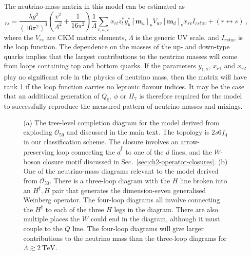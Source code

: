 The neutrino-mass matrix in this model can be estimated as
\begin{equation}
  [\mathbf{m}_{\nu}]_{rs} = \frac{\lambda g^{2}}{(16\pi^{2})^{3}} \left( \frac{v^{2}}{\Lambda^{2}} + \frac{1}{16\pi^{2}}\right) \frac{1}{\Lambda}\sum_{t,u,v} x_{rt} z^{*}_{t} y^{*}_{u} [\mathbf{m}_{u}]_{u} V_{uv} [\mathbf{m}_{d}]_{v} x_{sv} I_{rstuv} + (r \leftrightarrow s) \ ,
\end{equation}
where the $V_{rs}$ are CKM matrix elements, $\Lambda$ is the generic UV scale,
and $I_{rstuv}$ is the loop function. The dependence on the masses of the up-
and down-type quarks implies that the largest contributions to the neutrino
masses will come from loops containing top and bottom quarks. If the parameters
$y_{1,2}$, $x_{r1}$ and $x_{r2}$ play no significant role in the physics of
neutrino mass, then the matrix will have rank 1 if the loop function carries no
leptonic flavour indices. It may be the case that an additional generation of
$Q_{5}$, $\phi$ or $\Pi_{7}$ is therefore required for the model to successfully
reproduce the measured pattern of neutrino masses and mixings.

\begin{figure}[t]
  \centering
  \caption[(a) The tree-level completion diagram for the model derived from
  exploding $\mathcal{O}_{50}$ and discussed in the main text. (b) One of the
  neutrino-mass diagrams relevant to the model derived from
  $\mathcal{O}_{50}$.]{(a) The tree-level completion diagram for the model
    derived from exploding $\mathcal{O}_{50}$ and discussed in the main text.
    The topology is $2s6f_{4}$ in our classification scheme. The closure
    involves an arrow-preserving loop connecting the $\bar{d}^{\dagger}$ to one
    of the $\bar{d}$ lines, and the $W$-boson closure motif discussed in
    Sec.~\ref{sec:ch2-operator-closures}. (b) One of the neutrino-mass diagrams
    relevant to the model derived from $\mathcal{O}_{50}$. There is a three-loop
    diagram with the $H$ line broken into an $H^{\dagger}, H$ pair that
    generates the dimension-seven generalised Weinberg operator. The four-loop
    diagrams all involve connecting the $H^{\dagger}$ to each of the three $H$
    legs in the diagram. There are also multiple places the $W$ could end in the
    diagram, although it must couple to the $Q$ line. The four-loop diagrams
    will give larger contributions to the neutrino mass than the three-loop
    diagrams for $\Lambda \gtrsim \SI{2}{\TeV}$.}
  \label{fig:ch2-lowscale-example}
\end{figure}

